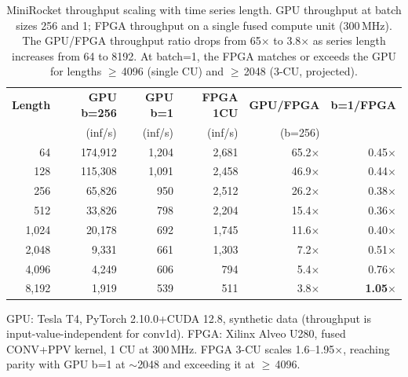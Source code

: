 % 

\begin{table}[t]
\centering
\caption{MiniRocket throughput scaling with time series length. GPU throughput
at batch sizes 256 and 1; FPGA throughput on a single fused compute unit
(300\,MHz). The GPU/FPGA throughput ratio drops from 65$\times$ to
3.8$\times$ as series length increases from 64 to 8192. At batch=1, the FPGA
matches or exceeds the GPU for lengths $\geq$\,4096 (single CU) and
$\geq$\,2048 (3-CU, projected).}
\label{tab:gpu_scalability}
\begin{tabular}{r r r r r r}
\toprule
\textbf{Length} & \textbf{GPU b=256} & \textbf{GPU b=1} & \textbf{FPGA 1CU} & \textbf{GPU/FPGA} & \textbf{b=1/FPGA} \\
 & (inf/s) & (inf/s) & (inf/s) & (b=256) & \\
\midrule
64    & 174,912 & 1,204 & 2,681 & 65.2$\times$ & 0.45$\times$ \\
128   & 115,308 & 1,091 & 2,458 & 46.9$\times$ & 0.44$\times$ \\
256   &  65,826 &   950 & 2,512 & 26.2$\times$ & 0.38$\times$ \\
512   &  33,826 &   798 & 2,204 & 15.4$\times$ & 0.36$\times$ \\
1,024 &  20,178 &   692 & 1,745 & 11.6$\times$ & 0.40$\times$ \\
2,048 &   9,331 &   661 & 1,303 &  7.2$\times$ & 0.51$\times$ \\
4,096 &   4,249 &   606 &   794 &  5.4$\times$ & 0.76$\times$ \\
8,192 &   1,919 &   539 &   511 &  3.8$\times$ & \textbf{1.05$\times$} \\
\bottomrule
\end{tabular}
\vspace{1mm}

{\footnotesize GPU: Tesla T4, PyTorch 2.10.0+CUDA 12.8, synthetic data (throughput
is input-value-independent for conv1d). FPGA: Xilinx Alveo U280, fused
CONV+PPV kernel, 1 CU at 300\,MHz. FPGA 3-CU scales 1.6--1.95$\times$,
reaching parity with GPU b=1 at $\sim$2048 and exceeding it at $\geq$\,4096.}
\end{table}
